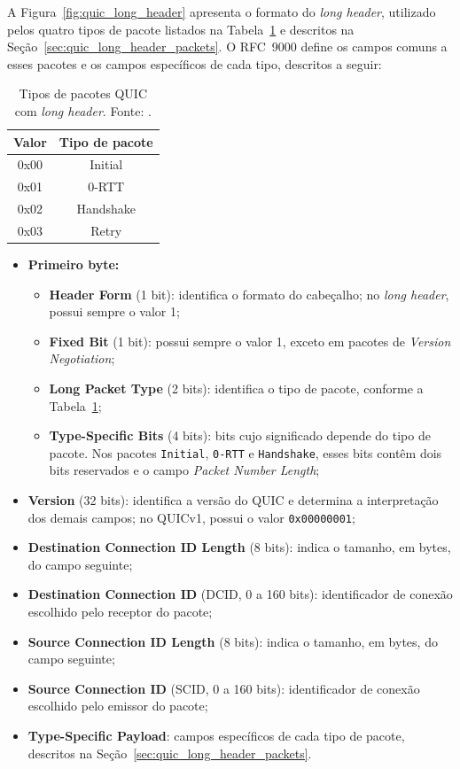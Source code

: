 A Figura~\ref{fig:quic_long_header} apresenta o formato do \textit{long header}, utilizado pelos quatro tipos de pacote listados na Tabela~\ref{tab:quic_long_header_packets} e descritos na Seção~\ref{sec:quic_long_header_packets}. O RFC~9000 \citep{rfc9000} define os campos comuns a esses pacotes e os campos específicos de cada tipo, descritos a seguir:


\begin{table}[!ht]
    \centering
    \begin{tabular}{|c|c|}
        \hline
        \textbf{Valor} & \textbf{Tipo de pacote} \\
        \hline
        0x00 & Initial   \\
        0x01 & 0-RTT     \\
        0x02 & Handshake \\
        0x03 & Retry     \\
        \hline
    \end{tabular}
    \caption{Tipos de pacotes QUIC com \textit{long header}. Fonte: \citep{rfc9000}.}
    \label{tab:quic_long_header_packets}
\end{table}

\begin{itemize}
    \item \textbf{Primeiro byte:}
    \begin{itemize}
        \item \textbf{Header Form} (1 bit): identifica o formato do cabeçalho; no \textit{long header}, possui sempre o valor 1;
        \item \textbf{Fixed Bit} (1 bit): possui sempre o valor 1, exceto em pacotes de \textit{Version Negotiation};
        \item \textbf{Long Packet Type} (2 bits): identifica o tipo de pacote, conforme a Tabela~\ref{tab:quic_long_header_packets};
        \item \textbf{Type-Specific Bits} (4 bits): bits cujo significado depende do tipo de pacote. Nos pacotes \texttt{Initial}, \texttt{0-RTT} e \texttt{Handshake}, esses bits contêm dois bits reservados e o campo \textit{Packet Number Length};
    \end{itemize}
    \item \textbf{Version} (32 bits): identifica a versão do QUIC e determina a interpretação dos demais campos; no QUICv1, possui o valor \texttt{0x00000001};
    \item \textbf{Destination Connection ID Length} (8 bits): indica o tamanho, em bytes, do campo seguinte;
    \item \textbf{Destination Connection ID} (DCID, 0 a 160 bits): identificador de conexão escolhido pelo receptor do pacote;
    \item \textbf{Source Connection ID Length} (8 bits): indica o tamanho, em bytes, do campo seguinte;
    \item \textbf{Source Connection ID} (SCID, 0 a 160 bits): identificador de conexão escolhido pelo emissor do pacote;
    \item \textbf{Type-Specific Payload}: campos específicos de cada tipo de pacote, descritos na Seção~\ref{sec:quic_long_header_packets}.
\end{itemize}

